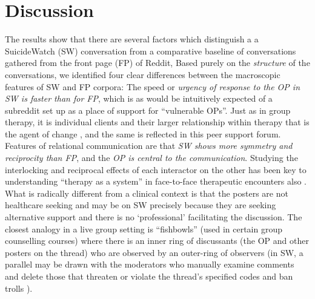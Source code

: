 \section{Discussion}

The results show that there are several factors which distinguish a a SuicideWatch (SW) conversation from a comparative baseline of  conversations gathered from the front page (FP) of Reddit, Based purely on the \textit{ structure} of the conversations, we identified four clear differences between the macroscopic features of SW and  FP corpora:  The speed or \textit{urgency of response to the OP in SW is faster than for FP}, which is as would be intuitively expected of a subreddit set up as a place of support for “vulnerable OPs”.  
Just as in group therapy, it is individual clients and their larger relationship within therapy that is the agent of change \cite{yalom_theory_1995}, and the same is reflected in this peer support forum.   
Features of relational communication \cite{rogers_overview_1983} are that \textit{SW shows more symmetry and reciprocity than FP}, and the \textit{OP is central to the communication}.  Studying the interlocking and reciprocal effects of each interactor on the other has been key to understanding “therapy as a system” in face-to-face therapeutic encounters also \cite{de_shazer_putting_1991}.
What is radically different from a clinical context is that the posters are not healthcare seeking and may be on SW precisely because they are seeking alternative support and there is no ‘professional’ facilitating the discussion.  The closest analogy in a live group setting is “fishbowls” (used in certain group counselling courses) \cite{keim_groupwork_2013} where there is an inner ring of discussants (the OP and other posters on the thread) who are observed by an outer-ring of observers (in SW, a parallel may be drawn with the moderators who manually examine comments and delete those that threaten or violate the thread’s specified codes and ban trolls \cite{choudhury_language_2017}).


